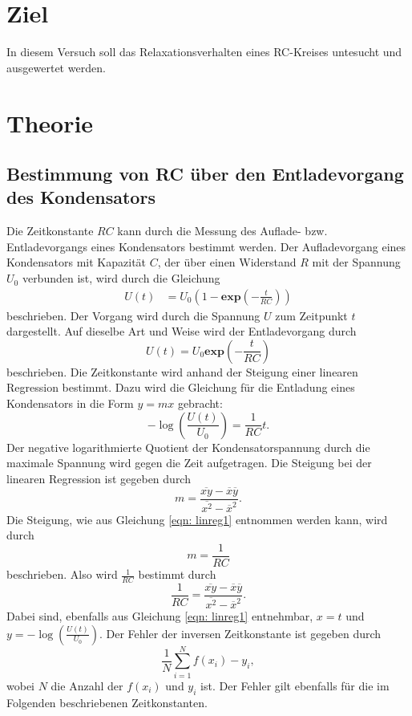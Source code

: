 
\section{Ziel}
In diesem Versuch soll das Relaxationsverhalten eines RC-Kreises untesucht und ausgewertet werden. 

\section{Theorie}
\cite{versuch}
\label{sec:Theorie}
\subsection{Bestimmung von RC über den Entladevorgang des Kondensators}
Die Zeitkonstante $RC$ kann durch die Messung des Auflade- bzw. Entladevorgangs eines Kondensators bestimmt werden.
Der Aufladevorgang eines Kondensators mit Kapazität $C$, der über einen Widerstand $R$ mit der Spannung $U_{0}$ verbunden ist, wird durch die Gleichung
\begin{align*}
     U(t)&= U_{0} (1-\mathbf{exp}(-\frac{t}{RC}))
\end{align*}
beschrieben. Der Vorgang wird durch die Spannung $U$ zum Zeitpunkt $t$ dargestellt. 
Auf dieselbe Art und Weise wird der Entladevorgang durch
\begin{equation*}
     U(t) = U_{0} \mathbf{exp}(-\frac{t}{RC})
\end{equation*}
beschrieben.
Die Zeitkonstante wird anhand der Steigung einer linearen Regression bestimmt.
Dazu wird die Gleichung für die Entladung eines Kondensators in die Form $y=mx$ gebracht:
\begin{equation}
    - \log(\frac{U(t)}{U_{0}}) = \frac{1}{RC} t.
    \label{eqn: linreg1}
\end{equation}
Der negative logarithmierte Quotient der Kondensatorspannung durch die maximale Spannung wird gegen die Zeit aufgetragen.
Die Steigung bei der linearen Regression ist gegeben durch
\begin{equation}
    m = \frac{\overline{xy} - \overline{x}\overline{y}}{\overline{x^2} - \overline{x}^2}.
    \label{eqn: m}
\end{equation}
Die Steigung, wie aus Gleichung \eqref{eqn: linreg1} entnommen werden kann, wird durch
\begin{equation*}
    m = \frac{1}{RC}
\end{equation*}
beschrieben. Also wird $\frac{1}{RC}$ bestimmt durch
\begin{equation}
    \frac{1}{RC}= \frac{\overline{xy} - \overline{x}\overline{y}}{\overline{x^2} - \overline{x}^2}.
    \label{eqn: RC}
\end{equation}
Dabei sind, ebenfalls aus Gleichung \eqref{eqn: linreg1} entnehmbar, $x=t$ und $y=-\log(\frac{U(t)}{U_{0}})$. %
Der Fehler der inversen Zeitkonstante ist gegeben durch
\begin{equation}
    \frac{1}{N} \sum_{i=1}^N f(x_{i}) - y_{i},
    \label{eqn: fehler}
\end{equation}
wobei $N$ die Anzahl der %
$f(x_{i})$ %
und $y_{i}$ %
ist. Der Fehler gilt ebenfalls für die im Folgenden beschriebenen Zeitkonstanten.

